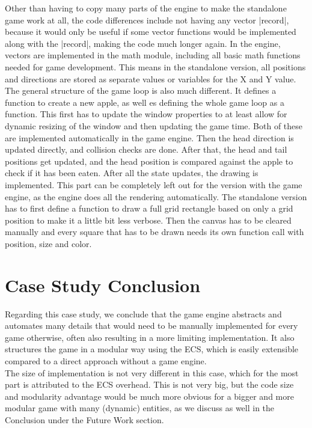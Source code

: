 Other than having to copy many parts of the engine to make the standalone game work at all, the code differences include not having any vector |record|, because it would only be useful if some vector functions would be implemented along with the |record|, making the code much longer again. In the engine, vectors are implemented in the math module, including all basic math functions needed for game development. This means in the standalone version, all positions and directions are stored as separate values or variables for the X and Y value.\\
The general structure of the game loop is also much different. It defines a function to create a new apple, as well es defining the whole game loop as a function. This first has to update the window properties to at least allow for dynamic resizing of the window and then updating the game time. Both of these are implemented automatically in the game engine. Then the head direction is updated directly, and collision checks are done. After that, the head and tail positions get updated, and the head position is compared against the apple to check if it has been eaten. After all the state updates, the drawing is implemented. This part can be completely left out for the version with the game engine, as the engine does all the rendering automatically. The standalone version has to first define a function to draw a full grid rectangle based on only a grid position to make it a little bit less verbose. Then the canvas has to be cleared manually and every square that has to be drawn needs its own function call with position, size and color.

\section{Case Study Conclusion}

Regarding this case study, we conclude that the game engine abstracts and automates many details that would need to be manually implemented for every game otherwise, often also resulting in a more limiting implementation. It also structures the game in a modular way using the ECS, which is easily extensible compared to a direct approach without a game engine.\\
The size of implementation is not very different in this case, which for the most part is attributed to the ECS overhead. This is not very big, but the code size and modularity advantage would be much more obvious for a bigger and more modular game with many (dynamic) entities, as we discuss as well in the Conclusion under the Future Work section.
